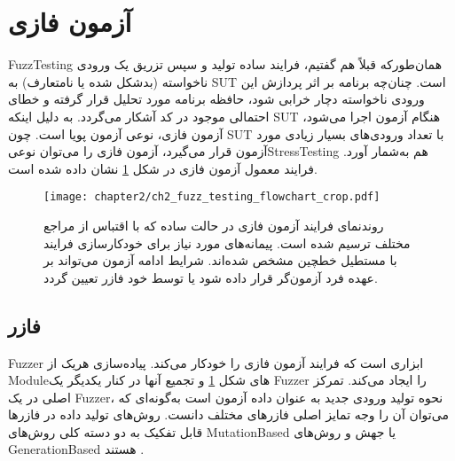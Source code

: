   
\section{آزمون فازی}
\gls{FuzzTesting}\cite{Miller:1990:ESR:96267.96279,Miller1995,Forrester:2000:ESR:1267102.1267108,Miller:2006:ESR:1145735.1145743}
همان‌طورکه قبلاً هم گفتیم، فرایند ساده تولید و سپس تزریق یک ورودی ناخواسته (بدشکل شده یا نامتعارف) به \gls{SUT} است. چنان‌چه برنامه بر اثر پردازش این ورودی ناخواسته دچار خرابی شود، حافظه برنامه مورد تحلیل قرار گرفته و خطای احتمالی موجود در کد آشکار می‌گردد. به دلیل اینکه \gls{SUT} هنگام آزمون اجرا می‌شود، آزمون فازی، نوعی آزمون پویا است. چون \gls{SUT} با تعداد ورودی‌های بسیار زیادی مورد آزمون قرار می‌گیرد، آزمون فازی را می‌توان نوعی\gls{StressTesting} هم به‌شمار آورد. فرایند معمول آزمون فازی در ‏شکل
\ref{ch2_fuzz_testing_flowchart_crop.pdf} نشان داده شده است.


\begin{figure}%
	\centering
	\texttt{[image: chapter2/ch2\_fuzz\_testing\_flowchart\_crop.pdf]}
	\caption[روندنمای  فرایند آزمون فازی]
	{
		روندنمای فرایند آزمون فازی در حالت ساده که با اقتباس از مراجع مختلف ترسیم شده است. پیمانه‌های مورد نیاز برای خودکارسازی فرایند با مستطیل خطچین مشخص شده‌اند. شرایط ادامه آزمون می‌تواند بر عهده فرد آزمون‌گر قرار داده شود یا توسط خود فازر تعیین گردد.
	}
	\label{ch2_fuzz_testing_flowchart_crop.pdf}
\end{figure}



\subsection{فازر}\label{sec:fuzzer}
\gls{Fuzzer} ابزاری است که فرایند آزمون فازی را خودکار می‌کند. پیاده‌سازی هریک از \gls{Module}‌های شکل
\ref{ch2_fuzz_testing_flowchart_crop.pdf}
و تجمیع آنها در کنار یکدیگر یک \gls{Fuzzer} را ایجاد می‌کند. تمرکز اصلی در یک \gls{Fuzzer}، نحوه تولید ورودی جدید به عنوان داده آزمون است به‌گونه‌ای که می‌توان آن را وجه تمایز اصلی فازرهای مختلف دانست. روش‌های تولید داده در فازرها قابل تفکیک به دو دسته کلی روش‌های \gls{MutationBased} یا جهش و روش‌های \gls{GenerationBased} 
هستند \cite{Chen2018}.


